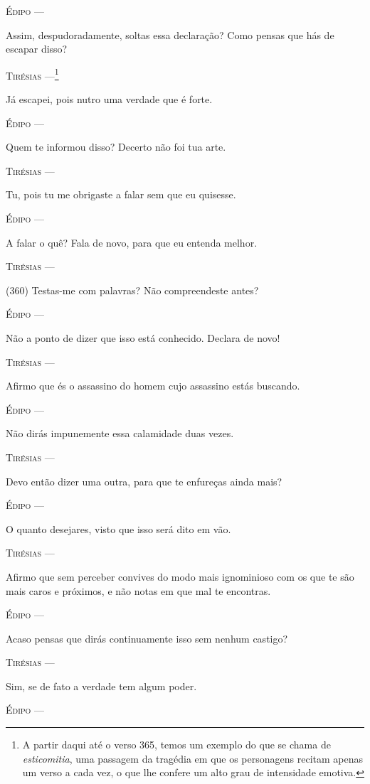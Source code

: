 \textsc{Édipo} ---

Assim, despudoradamente, soltas essa declaração? Como pensas que hás de
escapar disso?

\textsc{Tirésias} ---\footnote{A partir daqui até o verso 365, temos um
  exemplo do que se chama de \emph{esticomitia}, uma passagem da
  tragédia em que os personagens recitam apenas um verso a cada vez, o
  que lhe confere um alto grau de intensidade emotiva.}

Já escapei, pois nutro uma verdade que é forte.

\textsc{Édipo} ---

Quem te informou disso? Decerto não foi tua arte.

\textsc{Tirésias} ---

Tu, pois tu me obrigaste a falar sem que eu quisesse.

\textsc{Édipo} ---

A falar o quê? Fala de novo, para que eu entenda melhor.

\textsc{Tirésias} ---

(360) Testas-me com palavras? Não compreendeste antes?

\textsc{Édipo} ---

Não a ponto de dizer que isso está conhecido. Declara de novo!

\textsc{Tirésias} ---

Afirmo que és o assassino do homem cujo assassino estás buscando.

\textsc{Édipo} ---

Não dirás impunemente essa calamidade duas vezes.

\textsc{Tirésias} ---

Devo então dizer uma outra, para que te enfureças ainda mais?

\textsc{Édipo} ---

O quanto desejares, visto que isso será dito em vão.

\textsc{Tirésias} ---

Afirmo que sem perceber convives do modo mais ignominioso com os que te
são mais caros e próximos, e não notas em que mal te encontras.

\textsc{Édipo} ---

Acaso pensas que dirás continuamente isso sem nenhum castigo?

\textsc{Tirésias} ---

Sim, se de fato a verdade tem algum poder.

\textsc{Édipo} ---

